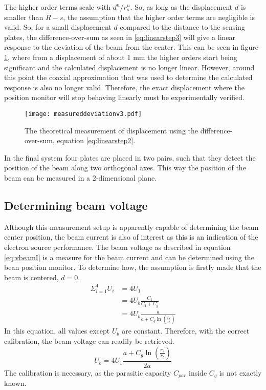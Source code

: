 The higher order terms scale with $d^n/r_s^n$. So, as long as the displacement $d$ is smaller than $R-s$, the assumption that the higher order terms are negligible is valid. So, for a small displacement $d$ compared to the distance to the sensing plates, the difference-over-sum as seen in \ref{eq:linearstep3} will give a linear response to the deviation of the beam from the center. This can be seen in figure \ref{fig:measd}, where from a displacement of about 1 mm the higher orders start being significant and the calculated displacement is no longer linear. However, around this point the coaxial approximation that was used to determine the calculated response is also no longer valid. Therefore, the exact displacement where the position monitor will stop behaving linearly must be experimentally verified.
\begin{figure}[h]
\centering
\texttt{[image: measureddeviationv3.pdf]}
\caption{The theoretical measurement of displacement using the difference-over-sum, equation \ref{eq:linearstep2}.}
\label{fig:measd}
\end{figure}
In the final system four plates are placed in two pairs, such that they detect the position of the beam along two orthogonal axes. This way the position of the beam can be measured in a 2-dimensional plane.

\subsection{Determining beam voltage}
Although this measurement setup is apparently capable of determining the beam center position, the beam current is also of interest as this is an indication of the electron source performance.
The beam voltage as described in equation \ref{eq:vbeamI} is a measure for the beam current and can be determined using the bean position monitor. To determine how, the assumption is firstly made that the beam is centered, $d=0$.
\begin{align}
\Sigma_{i=1}^4 U_i &= 4U_1 \nonumber\\
 &= 4U_b\frac{C_1}{C_1+C_g} \nonumber\\
 &= 4U_b\frac{a}{a+C_g\ln\left(\frac{r_s}{r_b}\right)}
\end{align}
In this equation, all values except $U_b$ are constant. Therefore, with the correct calibration, the beam voltage can readily be retrieved.
\begin{equation}
U_b =4U_1\frac{a+C_g\ln\left(\frac{r_s}{r_b}\right)}{2a} \label{eq:beamvoltagemeas}
\end{equation}
The calibration is necessary, as the parasitic capacity $C_{par}$ inside $C_g$ is not exactly known.

